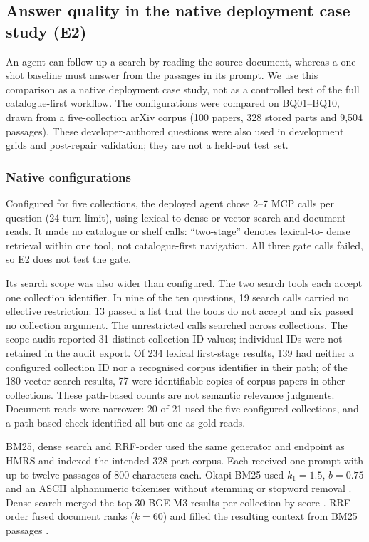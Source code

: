 \subsection{Answer quality in the native deployment case study (E2)}
\label{sec:e10}
\label{sec:external-baselines}
\label{sec:exp-e2}
An agent can follow up a search by reading the source document, whereas a
one-shot baseline must answer from the passages in its prompt. We use this
comparison as a native deployment case study, not as a controlled test of the
full catalogue-first workflow. The configurations were compared on BQ01--BQ10,
drawn from a five-collection
arXiv corpus (100 papers, 328 stored parts and 9{,}504 passages). These
developer-authored questions were also used in development grids and
post-repair validation; they are not a held-out test set.

\subsubsection{Native configurations}
Configured for five collections, the deployed agent chose 2--7 MCP calls per
question (24-turn limit), using lexical-to-dense or vector search and document
reads. It made no catalogue or shelf calls: ``two-stage'' denotes lexical-to-
dense retrieval within one tool, not catalogue-first navigation. All three
gate calls failed, so E2 does not test the gate.

Its search scope was also wider than configured. The two search tools each
accept one collection identifier. In nine of the ten questions, 19 search
calls carried no effective restriction: 13 passed a list that the tools do
not accept and six passed no collection argument. The unrestricted calls
searched across collections. The scope audit reported 31 distinct
collection-ID values; individual IDs were not retained in the audit export.
Of 234 lexical first-stage results, 139 had neither a
configured collection ID nor a recognised corpus identifier in their path;
of the 180 vector-search results, 77 were identifiable copies of corpus papers in
other collections. These path-based counts are not semantic relevance
judgments. Document reads were narrower: 20 of 21 used the five configured
collections, and a path-based check identified all but one as gold reads.

BM25, dense search and RRF-order used the same generator and endpoint as
HMRS and indexed the intended 328-part corpus. Each received one prompt with up to twelve passages of 800
characters each. Okapi BM25 used $k_1=1.5$, $b=0.75$ and an ASCII
alphanumeric tokeniser without stemming or stopword removal \citep{bm25}.
Dense search merged the top 30 BGE-M3 results per collection by score
\citep{bge-m3}. RRF-order fused document ranks ($k=60$) and filled the
resulting context from BM25 passages \citep{rrf-cormack}.

